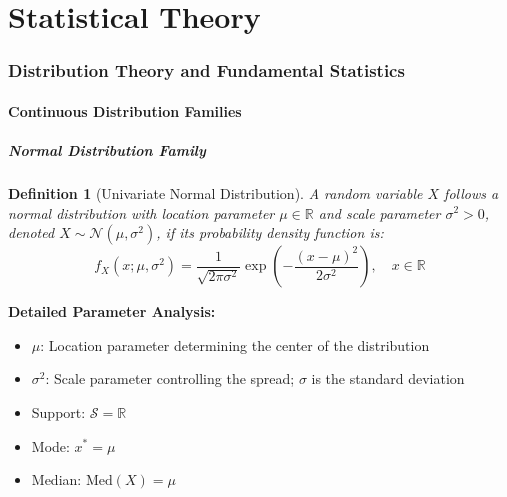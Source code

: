 \documentclass[12pt,a4paper]{article}
\newtheorem{definition}{Definition}[section]
\theoremstyle{remark}
\begin{document}
\part{Statistical Theory}

\section{Distribution Theory and Fundamental Statistics}

\subsection{Continuous Distribution Families}

\subsubsection{Normal Distribution Family}

\begin{definition}[Univariate Normal Distribution]
A random variable $X$ follows a normal distribution with location parameter $\mu \in \mathbb{R}$ and scale parameter $\sigma^2 > 0$, denoted $X \sim \mathcal{N}(\mu, \sigma^2)$, if its probability density function is:
$$f_X(x; \mu, \sigma^2) = \frac{1}{\sqrt{2\pi\sigma^2}} \exp\left(-\frac{(x-\mu)^2}{2\sigma^2}\right), \quad x \in \mathbb{R}$$
\end{definition}

\textbf{Detailed Parameter Analysis:}
\begin{itemize}
\item $\mu$: Location parameter determining the center of the distribution
\item $\sigma^2$: Scale parameter controlling the spread; $\sigma$ is the standard deviation
\item Support: $\mathcal{S} = \mathbb{R}$
\item Mode: $x^* = \mu$
\item Median: $\text{Med}(X) = \mu$
\end{itemize}
\end{document}
